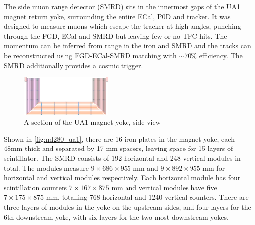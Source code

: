 The side muon range detector (SMRD)\cite{t2k_smrd} sits in the innermost gaps of the UA1 magnet return yoke, surrounding the entire ECal, P0D and tracker. It was designed to measure muons which escape the tracker at high angles, punching through the FGD, ECal and SMRD but leaving few or no TPC hits. The momentum can be inferred from range in the iron and SMRD and the tracks can be reconstructed using FGD-ECal-SMRD matching with $\sim70\%$ efficiency. The SMRD additionally provides a cosmic trigger.
\begin{figure}[h]
	\includegraphics[width=0.4\textwidth, trim={0mm 0mm 0mm 0mm}, clip,page=1]{figures/det_chap/smrd/ua1_smrd}
	\caption{A section of the UA1 magnet yoke, side-view}
	\label{fig:nd280_ua1}
\end{figure}

Shown in \autoref{fig:nd280_ua1}, there are 16 iron plates in the magnet yoke, each 48mm thick and separated by 17 mm spacers, leaving space for 15 layers of scintillator. The SMRD consists of 192 horizontal and 248 vertical modules in total. The modules measure $9\times686\times955\text{ mm}$ and $9\times892\times955\text{ mm}$ for horizontal and vertical modules respectively. Each horizontal module has four scintillation counters $7\times167\times875\text{ mm}$ and vertical modules have five $7\times175\times875\text{ mm}$, totalling 768 horizontal and 1240 vertical counters. There are three layers of modules in the yoke on the upstream sides, and four layers for the 6th downstream yoke, with six layers for the two most downstream yokes.

